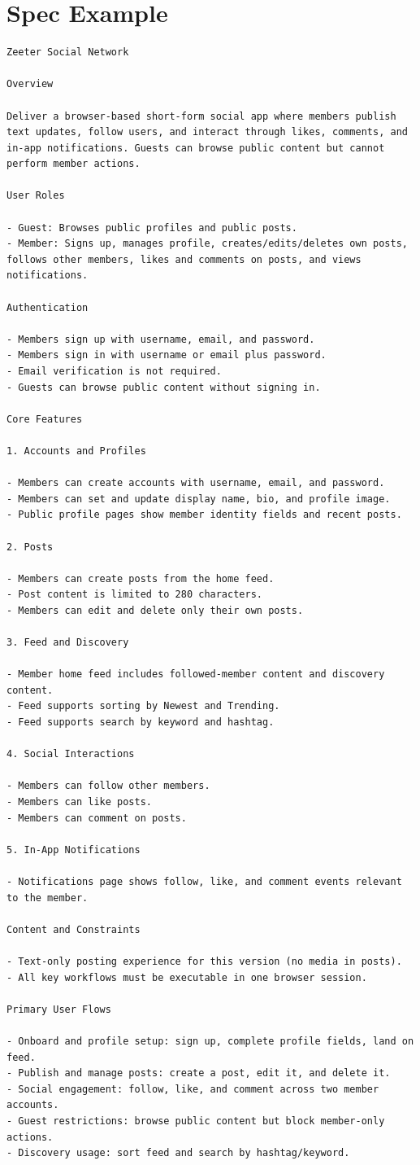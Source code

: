 \section{Spec Example}
\label{sec:appendix-spec-example}
\begin{lstlisting}
Zeeter Social Network

Overview

Deliver a browser-based short-form social app where members publish text updates, follow users, and interact through likes, comments, and in-app notifications. Guests can browse public content but cannot perform member actions.

User Roles

- Guest: Browses public profiles and public posts.
- Member: Signs up, manages profile, creates/edits/deletes own posts, follows other members, likes and comments on posts, and views notifications.

Authentication

- Members sign up with username, email, and password.
- Members sign in with username or email plus password.
- Email verification is not required.
- Guests can browse public content without signing in.

Core Features

1. Accounts and Profiles

- Members can create accounts with username, email, and password.
- Members can set and update display name, bio, and profile image.
- Public profile pages show member identity fields and recent posts.

2. Posts

- Members can create posts from the home feed.
- Post content is limited to 280 characters.
- Members can edit and delete only their own posts.

3. Feed and Discovery

- Member home feed includes followed-member content and discovery content.
- Feed supports sorting by Newest and Trending.
- Feed supports search by keyword and hashtag.

4. Social Interactions

- Members can follow other members.
- Members can like posts.
- Members can comment on posts.

5. In-App Notifications

- Notifications page shows follow, like, and comment events relevant to the member.

Content and Constraints

- Text-only posting experience for this version (no media in posts).
- All key workflows must be executable in one browser session.

Primary User Flows

- Onboard and profile setup: sign up, complete profile fields, land on feed.
- Publish and manage posts: create a post, edit it, and delete it.
- Social engagement: follow, like, and comment across two member accounts.
- Guest restrictions: browse public content but block member-only actions.
- Discovery usage: sort feed and search by hashtag/keyword.

\end{lstlisting}


